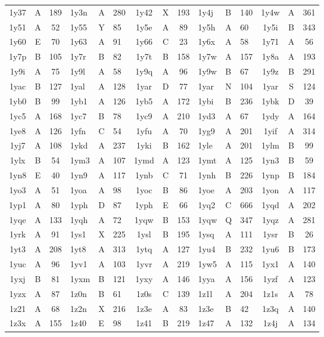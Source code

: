 \begin{longtable}{|c|c|c| a|a|a| c|c|c| a|a|a| c|c|c|}
1y37 & A & 189 & 1y3n & A & 280 & 1y42 & X & 193 & 1y4j & B & 140 & 1y4w & A & 361\\
1y51 & A & 52 & 1y55 & Y & 85 & 1y5e & A & 89 & 1y5h & A & 60 & 1y5i & B & 343\\
1y60 & E & 70 & 1y63 & A & 91 & 1y66 & C & 23 & 1y6x & A & 58 & 1y71 & A & 56\\
1y7p & B & 105 & 1y7r & B & 82 & 1y7t & B & 158 & 1y7w & A & 157 & 1y8a & A & 193\\
1y9i & A & 75 & 1y9l & A & 58 & 1y9q & A & 96 & 1y9w & B & 67 & 1y9z & B & 291\\
1yac & B & 127 & 1yal & A & 128 & 1yar & D & 77 & 1yar & N & 104 & 1yar & S & 124\\
1yb0 & B & 99 & 1yb1 & A & 126 & 1yb5 & A & 172 & 1ybi & B & 236 & 1ybk & D & 39\\
1yc5 & A & 168 & 1yc7 & B & 78 & 1yc9 & A & 210 & 1yd3 & A & 67 & 1ydy & A & 164\\
1ye8 & A & 126 & 1yfn & C & 54 & 1yfu & A & 70 & 1yg9 & A & 201 & 1yif & A & 314\\
1yj7 & A & 108 & 1ykd & A & 237 & 1yki & B & 162 & 1yle & A & 201 & 1ylm & B & 99\\
1ylx & B & 54 & 1ym3 & A & 107 & 1ymd & A & 123 & 1ymt & A & 125 & 1yn3 & B & 59\\
1yn8 & E & 40 & 1yn9 & A & 117 & 1ynb & C & 71 & 1ynh & B & 226 & 1ynp & B & 184\\
1yo3 & A & 51 & 1yoa & A & 98 & 1yoc & B & 86 & 1yoe & A & 203 & 1yon & A & 117\\
1yp1 & A & 80 & 1yph & D & 87 & 1yph & E & 66 & 1yq2 & C & 666 & 1yqd & A & 202\\
1yqe & A & 133 & 1yqh & A & 72 & 1yqw & B & 153 & 1yqw & Q & 347 & 1yqz & A & 281\\
1yrk & A & 91 & 1ys1 & X & 225 & 1ysl & B & 195 & 1ysq & A & 111 & 1ysr & B & 26\\
1yt3 & A & 208 & 1yt8 & A & 313 & 1ytq & A & 127 & 1yu4 & B & 232 & 1yu6 & B & 173\\
1yuc & A & 96 & 1yv1 & A & 103 & 1yvr & A & 219 & 1yw5 & A & 115 & 1yx1 & A & 140\\
1yxj & B & 81 & 1yxm & B & 121 & 1yxy & A & 146 & 1yya & A & 156 & 1yzf & A & 123\\
1yzx & A & 87 & 1z0n & B & 61 & 1z0s & C & 139 & 1z1l & A & 204 & 1z1s & A & 78\\
1z21 & A & 68 & 1z2n & X & 216 & 1z3e & A & 83 & 1z3e & B & 42 & 1z3q & A & 140\\
1z3x & A & 155 & 1z40 & E & 98 & 1z41 & B & 219 & 1z47 & A & 132 & 1z4j & A & 134\\

\end{longtable}

